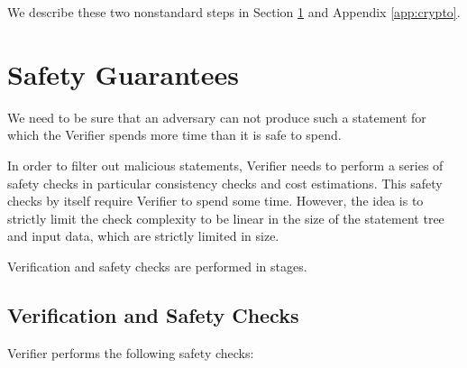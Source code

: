 \documentclass[11pt]{article}
\newcommand{\authnote}[2]{\marginpar{\parbox{\marginparwidth}{\tiny %
  \textsf{#1 {\textcolor{blue}{notes: #2}}}}}%
  \textcolor{blue}{\textbf{\dag}}}
\newcommand{\authnote}[2]{
  \textsf{#1 \textcolor{blue}{: #2}}}
\newcommand{\authnote}[2]{}
\newcommand{\lnote}[1]{{\authnote{\textcolor{orange}{Leo notes}}{#1}}}
\newcommand{\knote}[1]{{\authnote{\textcolor{green}{kushti notes}}{#1}}}
\begin{document}
\lnote{Is the above accurate about everything else being relatively standard? Is there anything we want to describe?}

We describe these two nonstandard steps in Section \ref{sec:safety} and Appendix \ref{app:crypto}. \lnote{Should they be both in the appendix or both in the main body?}


\section{Safety Guarantees}
\label{sec:safety}

We need to be sure that an adversary can not produce such a statement for
which the Verifier spends more time than it is safe to spend. \knote{links to
verifier dilemma, orphan rates etc}

In order to filter out malicious statements, Verifier needs to perform a
series of safety checks in particular consistency checks and cost
estimations. This safety checks by itself require Verifier to spend some
time. However, the idea is to strictly limit the check complexity to be
linear in the size of the statement tree and input data, which are strictly
limited in size.

Verification and safety checks are performed in stages.

\subsection{Verification and Safety Checks}
\label{sec:safety-checks}

Verifier performs the following safety checks:
\end{document}

